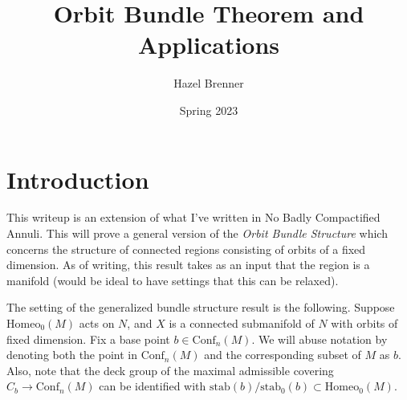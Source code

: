 \documentclass[10pt, oneside]{article}
\title{Orbit Bundle Theorem and Applications}
\author{Hazel Brenner}
\date{Spring 2023}
\newcommand{\homeo}[1][S^1]{\text{Homeo}_0(#1)}
\newcommand{\conf}[2][S^1]{\text{Conf}_{#2}(#1)}
\theoremstyle{definition}
\theoremstyle{definition}
\begin{document}
\maketitle

\section{Introduction}
This writeup is an extension 
of what I've written in No Badly Compactified Annuli.
This will prove a general version of the {\it Orbit Bundle Structure} 
which concerns the structure of connected regions consisting of orbits of a fixed dimension. 
As of writing, 
this result takes as an input that the region is a manifold 
(would be ideal to have settings that this can be relaxed). 

The setting of the generalized bundle structure result is the following.  
Suppose $\homeo[M]$ acts on $N$,
and $X$ is a connected submanifold of $N$ 
with orbits of fixed dimension. 
Fix a base point $b\in \conf[M]{n}$. 
We will abuse notation 
by denoting both the point in $\conf[M]{n}$ 
and the corresponding subset of $M$ as $b$.
Also, 
note that the deck group of the maximal admissible covering $C_b \to \conf[M]{n}$ can be identified with $\text{stab}(b)/\text{stab}_0(b)\subset\homeo[M]$.
\end{document}
